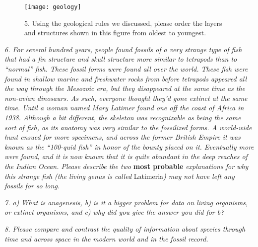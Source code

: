 \documentclass[11pt]{article}
\begin{document}
\begin{figure}[h!]
	\centering
	\texttt{[image: geology]}
	\captionsetup{labelformat=empty}
	\caption{5. Using the geological rules we discussed, please order the layers and structures shown in this figure from oldest to youngest.}
\end{figure}
\vspace{6cm}

\emph{6. For several hundred years, people found fossils of a very strange type of fish that had a fin structure and skull structure more similar to tetrapods than to ``normal'' fish. These fossil forms were found all over the world. These fish were found in shallow marine and freshwater rocks from before tetrapods appeared all the way through the Mesozoic era, but they disappeared at the same time as the non-avian dinosaurs. As such, everyone thought they'd gone extinct at the same time. Until a woman named Mary Latimer found one off the coast of Africa in 1938. Although a bit different, the skeleton was recognizable as being the same sort of fish, as its anatomy was very similar to the fossilized forms. A world-wide hunt ensued for more specimens, and across the former British Empire it was known as the ``100-quid fish'' in honor of the bounty placed on it. Eventually more were found, and it is now known that it is quite abundant in the deep reaches of the Indian Ocean. Please describe the two } \textbf{most probable} \emph{explanations for why this strange fish (the living genus is called} {Latimeria}\emph{) may not have left any fossils for so long.}
\vspace{6cm}

\emph{7. a) What is anagenesis, b) is it a bigger problem for data on living organisms, or extinct organisms, and c) why did you give the answer you did for b?}
\vspace{6cm}

\emph{8. Please compare and contrast the quality of information about species through time and across space in the modern world and in the fossil record.}
\vspace{6cm}
\end{document}
